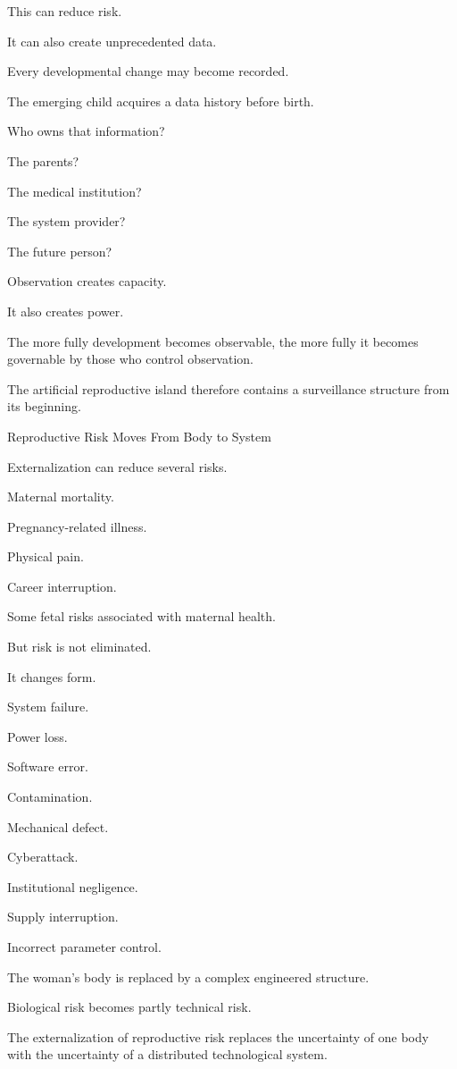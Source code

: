This can reduce risk.

It can also create unprecedented data.

Every developmental change may become recorded.

The emerging child acquires a data history before birth.

Who owns that information?

The parents?

The medical institution?

The system provider?

The future person?

Observation creates capacity.

It also creates power.

The more fully development becomes observable, the more fully it becomes governable by those who control observation.

The artificial reproductive island therefore contains a surveillance structure from its beginning.

Reproductive Risk Moves From Body to System

Externalization can reduce several risks.

Maternal mortality.

Pregnancy-related illness.

Physical pain.

Career interruption.

Some fetal risks associated with maternal health.

But risk is not eliminated.

It changes form.

System failure.

Power loss.

Software error.

Contamination.

Mechanical defect.

Cyberattack.

Institutional negligence.

Supply interruption.

Incorrect parameter control.

The woman’s body is replaced by a complex engineered structure.

Biological risk becomes partly technical risk.

The externalization of reproductive risk replaces the uncertainty of one body with the uncertainty of a distributed technological system.

